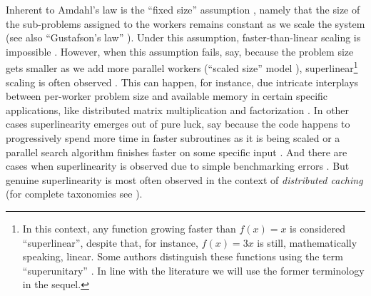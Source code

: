 

Inherent to Amdahl's law is the ``fixed size'' assumption \cite{556383}, namely that the size of the sub-problems assigned to the workers remains constant as we scale the system (see also ``Gustafson's law'' \cite{10.1145/42411.42415}). Under this assumption, faster-than-linear scaling is impossible \cite{10.1016/0167-8191(86)90024-4}. However, when this assumption fails, say, because the problem size gets smaller as we add more parallel workers (``scaled size'' model \cite{556383}), superlinear\footnote{In this context, any function growing faster than $f(x) = x$ is considered ``superlinear'', despite that, for instance, $f(x) = 3x$ is still, mathematically speaking, linear. Some authors distinguish these functions using the term ``superunitary'' \cite{80148}. In line with the literature we will use the former terminology in the sequel.} scaling is often observed \cite{scalability-analyzed, sdn-analytitcs, 6483679, 10.1007/978-3-319-77610-1, dobb-1, dobb-2}. This can happen, for instance, due intricate interplays between per-worker problem size and available memory in certain specific applications, like distributed matrix multiplication and factorization \cite{6483679, 80148, 7733347}. In other cases superlinearity emerges out of pure luck, say because the code happens to progressively spend more time in faster subroutines as it is being scaled \cite{556383} or a parallel search algorithm finishes faster on some specific input \cite{80148}. And there are cases when superlinearity is observed due to simple benchmarking errors \cite{gunther-hotsos,10.1145/2773212.2789974}. But genuine superlinearity is most often observed in the context of \emph{distributed caching} \cite{scalability-analyzed, sdn-analytitcs, dobb-2} (for complete taxonomies see \cite{556383, 7733347, 80148}).

